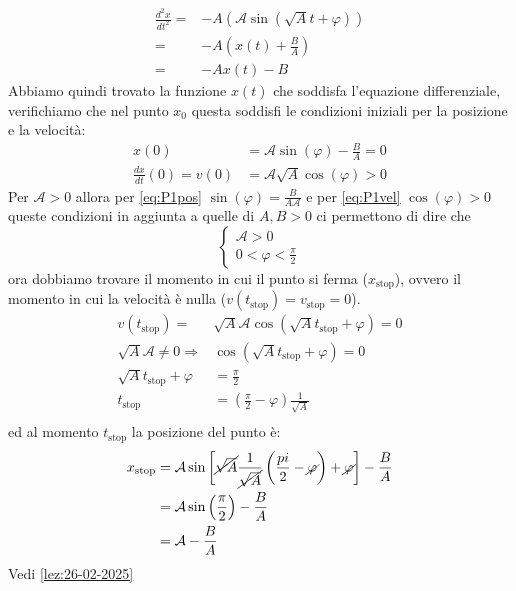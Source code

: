         $$
            \begin{aligned}
                \frac{d^2x}{dt^2} =& -A\left(\mathcal{A}\sin(\sqrt{A}t + \varphi)\right)\\
                =&-A\left(x(t)+\frac{B}{A}\right)\\
                =&-Ax(t)-B
            \end{aligned}
        $$
        Abbiamo quindi trovato la funzione $x(t)$ che soddisfa l'equazione differenziale, verifichiamo che nel punto $x_0$ questa soddisfi le condizioni iniziali per la posizione e la velocità:
        \begin{align}
            x(0) &= \mathcal{A}\sin(\varphi) - \frac{B}{A} = 0 \label{eq:P1pos}\\
            \frac{dx}{dt}(0) = v(0) &= \mathcal{A}\sqrt{A}\cos(\varphi) > 0 \label{eq:P1vel}
        \end{align}
        Per $\mathcal{A}>0$ allora per \ref{eq:P1pos} $\sin(\varphi) = \frac{B}{A\mathcal{A}}$ e per \ref{eq:P1vel} $\cos(\varphi) > 0$ queste condizioni in aggiunta a quelle di $ A,B>0 $ ci permettono di dire che $$
            \begin{cases}
                \mathcal{A}>0\\
                0<\varphi<\frac{\pi}{2}
            \end{cases}
        $$
        ora dobbiamo trovare il momento in cui il punto si ferma ($x_{\text{stop}}$), ovvero il momento in cui la velocità è nulla ($v(t_{\text{stop}})=v_{\text{stop}}=0$). 
        $$
            \begin{aligned}
                v(t_{\text{stop}}) =&\sqrt{A}\mathcal{A}\cos(\sqrt{A}t_{\text{stop}} + \varphi) = 0\\
                \sqrt{A}\mathcal{A}\neq 0\Rightarrow & \cos(\sqrt{A}t_{\text{stop}} + \varphi) = 0\\
                \sqrt{A}t_{\text{stop}} + \varphi &= \frac{\pi}{2}\\
                t_{\text{stop}} &= \left(\frac{\pi}{2}-\varphi\right)\frac{1}{\sqrt{A}}\\
            \end{aligned}
        $$
        ed al momento $t_{\text{stop}}$ la posizione del punto è:
        $$
            \begin{aligned}
                x_{\text{stop}} &= \mathcal{A}\sin\left[\cancel{\sqrt{A}}\frac{1}{\cancel{\sqrt{A}}}\left(\frac{pi}2-\cancel\varphi\right) + \cancel\varphi\right] - \frac{B}{A} \\
                &= \mathcal{A}\sin\left(\frac{\pi}{2}\right) - \frac{B}{A}\\
                &= \mathcal{A} - \frac{B}{A}
            \end{aligned}
        $$
        {\footnotesize Vedi \ref{lez:26-02-2025}}
